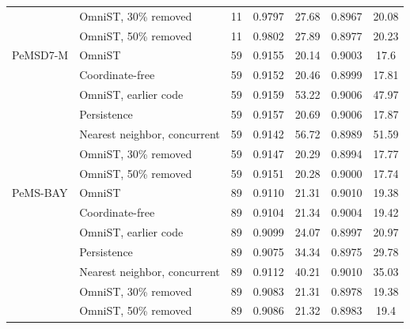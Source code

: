 \begin{table}[htbp]
\begin{tabular}{llrcccc}
 & OmniST, 30\% removed & 11 & 0.9797 & 27.68 & 0.8967 & 20.08 \\
 & OmniST, 50\% removed & 11 & 0.9802 & 27.89 & 0.8977 & 20.23 \\
\midrule
PeMSD7-M & OmniST & 59 & 0.9155 & 20.14 & 0.9003 & 17.6 \\
 & Coordinate-free & 59 & 0.9152 & 20.46 & 0.8999 & 17.81 \\
 & OmniST, earlier code & 59 & 0.9159 & 53.22 & 0.9006 & 47.97 \\
 & Persistence & 59 & 0.9157 & 20.69 & 0.9006 & 17.87 \\
 & Nearest neighbor, concurrent & 59 & 0.9142 & 56.72 & 0.8989 & 51.59 \\
 & OmniST, 30\% removed & 59 & 0.9147 & 20.29 & 0.8994 & 17.77 \\
 & OmniST, 50\% removed & 59 & 0.9151 & 20.28 & 0.9000 & 17.74 \\
\midrule
PeMS-BAY & OmniST & 89 & 0.9110 & 21.31 & 0.9010 & 19.38 \\
 & Coordinate-free & 89 & 0.9104 & 21.34 & 0.9004 & 19.42 \\
 & OmniST, earlier code & 89 & 0.9099 & 24.07 & 0.8997 & 20.97 \\
 & Persistence & 89 & 0.9075 & 34.34 & 0.8975 & 29.78 \\
 & Nearest neighbor, concurrent & 89 & 0.9112 & 40.21 & 0.9010 & 35.03 \\
 & OmniST, 30\% removed & 89 & 0.9083 & 21.31 & 0.8978 & 19.38 \\
 & OmniST, 50\% removed & 89 & 0.9086 & 21.32 & 0.8983 & 19.4 \\
\bottomrule
\end{tabular}
\end{table}

